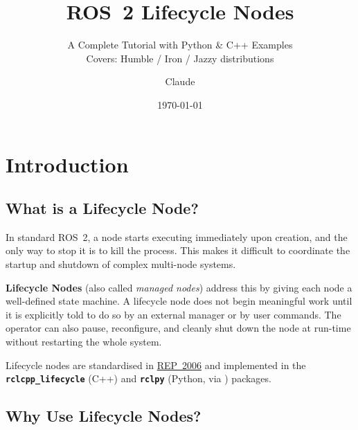\documentclass[11pt,a4paper]{csarticle}
\newcommand{\pkg}[1]{\textbf{\texttt{#1}}}
\begin{document}
\title{ROS~2 Lifecycle Nodes}
\subtitle{A Complete Tutorial with Python \& C++ Examples\\
	Covers: Humble / Iron / Jazzy distributions}
\author{Claude}
\date{\today}

\maketitle
\printabstract
\tableofcontents

\section{Introduction}
\label{sec:intro}

\subsection{What is a Lifecycle Node?}

In standard ROS~2, a node starts executing immediately upon creation, and the
only way to stop it is to kill the process.  This makes it difficult to
coordinate the startup and shutdown of complex multi-node systems.

\textbf{Lifecycle Nodes} (also called \emph{managed nodes}) address this by
giving each node a well-defined state machine.  A lifecycle node does not
begin meaningful work until it is explicitly told to do so by an external
manager or by user commands.  The operator can also pause, reconfigure, and
cleanly shut down the node at run-time without restarting the whole system.

Lifecycle nodes are standardised in
\href{https://design.ros2.org/articles/node_lifecycle.html}{REP~2006} and
implemented in the \pkg{rclcpp\_lifecycle} (C++) and
\pkg{rclpy} (Python, via ) packages.

\subsection{Why Use Lifecycle Nodes?}
\end{document}
